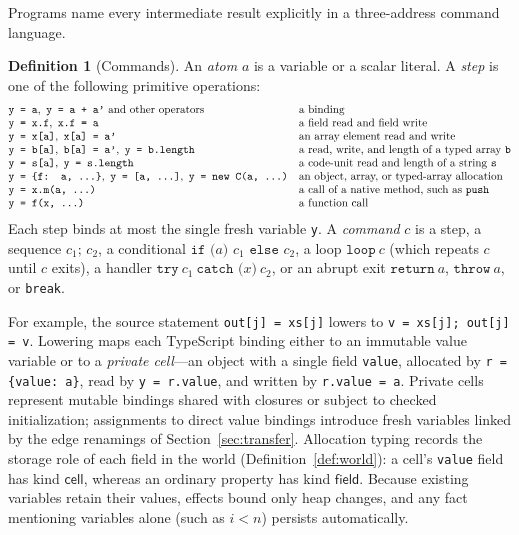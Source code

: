 \documentclass[10pt,a4paper]{article}
\theoremstyle{definition}
\newtheorem{definition}[theorem]{Definition}
\theoremstyle{remark}
\newcommand{\code}[1]{\texttt{#1}}
\newcommand{\kF}{\mathsf{field}}\newcommand{\kC}{\mathsf{cell}}\newcommand{\kE}{\mathsf{elem}}\newcommand{\kS}{\mathsf{spine}}\newcommand{\kI}{\mathsf{id}}
\begin{document}
Programs name every intermediate result explicitly in a three-address
command language.

\begin{definition}[Commands]\label{def:cmd}
An \emph{atom} $a$ is a variable or a scalar literal. A \emph{step} is
one of the following primitive operations:
{\small\begin{displaymath}
\begin{array}{@{}ll@{}}
\code{y = a},\ \code{y = a + a'}\ \text{and other operators} & \text{a binding}\\
\code{y = x.f},\ \code{x.f = a} & \text{a field read and field write}\\
\code{y = x[a]},\ \code{x[a] = a'} & \text{an array element read and write}\\
\code{y = b[a]},\ \code{b[a] = a'},\ \code{y = b.length} & \text{a read, write, and length of a typed array \code{b}}\\
\code{y = s[a]},\ \code{y = s.length} & \text{a code-unit read and length of a string \code{s}}\\
\code{y = \{f: a, ...\}},\ \code{y = [a, ...]},\ \code{y = new C(a, ...)} & \text{an object, array, or typed-array allocation}\\
\code{y = x.m(a, ...)} & \text{a call of a native method, such as \code{push}}\\
\code{y = f(x, ...)} & \text{a function call}
\end{array}
\end{displaymath}}
Each step binds at most the single fresh variable \code{y}. A
\emph{command} $c$ is a step, a sequence $c_1\code{; }c_2$, a
conditional $\code{if (}a\code{) }c_1\code{ else }c_2$, a loop
$\code{loop}\ c$ (which repeats $c$ until $c$ exits), a handler
$\code{try}\ c_1\ \code{catch (}x\code{)}\ c_2$, or an abrupt exit
$\code{return}\ a$, $\code{throw}\ a$, or \code{break}.
\end{definition}

\noindent
For example, the source statement \code{out[j] = xs[j]} lowers to
\code{v = xs[j]; out[j] = v}. Lowering maps each TypeScript binding
either to an immutable value variable or to a \emph{private cell}---an
object with a single field \code{value}, allocated by
\code{r = \{value: a\}}, read by \code{y = r.value}, and written by
\code{r.value = a}. Private cells represent mutable bindings shared with
closures or subject to checked initialization; assignments to direct
value bindings introduce fresh variables linked by the edge renamings of
Section~\ref{sec:transfer}. Allocation typing records the storage role
of each field in the world (Definition~\ref{def:world}): a cell's
\code{value} field has kind $\kC$, whereas an ordinary property has kind
$\kF$. Because existing variables retain their values, effects bound
only heap changes, and any fact mentioning variables alone (such as
$i<n$) persists automatically.
\end{document}
